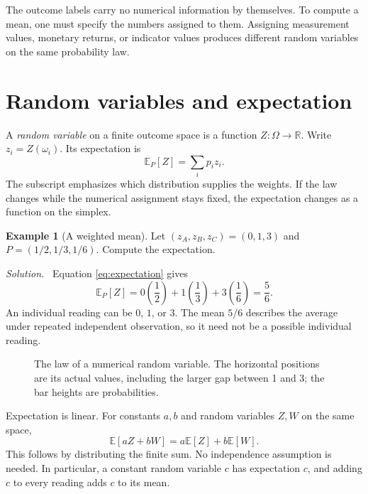 \documentclass[11pt,oneside,openany]{book}
\theoremstyle{definition}
\newtheorem{example}{Example}[chapter]
\theoremstyle{remark}
\newenvironment{solution}{\par\smallskip\noindent\textit{Solution.}\ }{\par\smallskip}
\newcommand{\R}{\mathbb{R}}
\newcommand{\E}{\mathbb{E}}
\numberwithin{equation}{chapter}
\begin{document}
The outcome labels carry no numerical information by themselves. To compute a mean, one must specify the numbers assigned to them. Assigning measurement values, monetary returns, or indicator values produces different random variables on the same probability law.

\section{Random variables and expectation}
A \emph{random variable} on a finite outcome space is a function $Z:\Omega\to\R$. Write $z_i=Z(\omega_i)$. Its expectation is
\begin{equation}\label{eq:expectation}
\E_P[Z]=\sum_i p_i z_i.
\end{equation}
The subscript emphasizes which distribution supplies the weights. If the law changes while the numerical assignment stays fixed, the expectation changes as a function on the simplex.

\begin{example}[A weighted mean]
Let $(z_A,z_B,z_C)=(0,1,3)$ and $P=(1/2,1/3,1/6)$. Compute the expectation.
\begin{solution}
Equation \eqref{eq:expectation} gives
\[
\E_P[Z]=0\left(\frac12\right)+1\left(\frac13\right)+3\left(\frac16\right)=\frac56.
\]
An individual reading can be $0$, $1$, or $3$. The mean $5/6$ describes the average under repeated independent observation, so it need not be a possible individual reading.
\end{solution}
\end{example}

\begin{figure}[htbp]
\centering
{}
\caption{The law of a numerical random variable. The horizontal positions are its actual values, including the larger gap between 1 and 3; the bar heights are probabilities.}
\end{figure}

Expectation is linear. For constants $a,b$ and random variables $Z,W$ on the same space,
\[
\E[aZ+bW]=a\E[Z]+b\E[W].
\]
This follows by distributing the finite sum. No independence assumption is needed. In particular, a constant random variable $c$ has expectation $c$, and adding $c$ to every reading adds $c$ to its mean.
\end{document}
